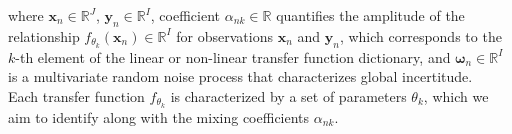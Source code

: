 \documentclass[10pt]{extarticle}
\begin{document}
where $\mathbf{x}_n \in \mathbb{R}^{J}$, $\mathbf{y}_n \in \mathbb{R}^{I}$, coefficient $\alpha_{nk} \in \mathbb{R}$ quantifies the amplitude of the relationship $f_{\theta_k}(\mathbf{x}_n) \in \mathbb{R}^{I}$ for observations $\mathbf{x}_n$ and $\mathbf{y}_n$, which corresponds to the $k$-th element of the linear or non-linear transfer function dictionary, and $\boldsymbol\omega_n \in \mathbb{R}^{I}$ is a multivariate random noise process that characterizes global incertitude.\\
Each transfer function $f_{\theta_k}$ is characterized by a set of parameters $\theta_k$, which we aim to identify along with the mixing coefficients $\alpha_{nk}$.\\
\end{document}
